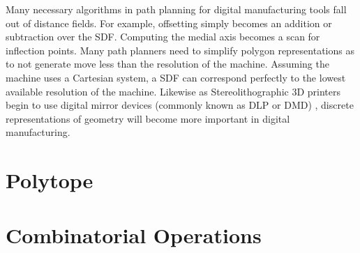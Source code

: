 Many necessary algorithms in path planning for digital manufacturing tools
fall out of distance fields. For example, offsetting simply becomes
an addition or subtraction over the SDF. Computing the medial axis becomes
a scan for inflection points. Many path planners need to simplify polygon
representations as to not generate move less than the resolution of the machine.
Assuming the machine uses a Cartesian system, a SDF can correspond perfectly
to the lowest available resolution of the machine.
Likewise as Stereolithographic 3D printers
begin to use digital mirror devices (commonly known as DLP or DMD)
, discrete representations of geometry will become more important in
digital manufacturing.

\cite{Pasko_Adzhiev_Comninos_2008}


\section{Polytope}


\section{Combinatorial Operations}




